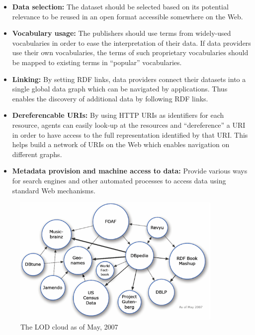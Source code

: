 \begin{itemize}
\item \textbf{Data selection:} The dataset should be selected based on its potential relevance to be reused in an open format accessible somewhere on the Web.
\item \textbf{Vocabulary usage:} The publishers should use terms from widely-used vocabularies in order to ease the interpretation of their data. If data providers use their own vocabularies, the terms of such proprietary vocabularies should be mapped to existing terms in ``popular'' vocabularies.

\item \textbf{Linking:} By setting RDF links, data providers connect their datasets into a single global data graph which can be navigated by applications. Thus enables the discovery of additional data by following RDF links.

\item \textbf{Dereferencable URIs:} By using HTTP URIs as identifiers for each resource, agents can easily look-up at the resources and ``dereference'' a URI in order to have access to the full representation identified by that URI. This helps build a network of URIs on the Web which enables navigation on different graphs. 

\item \textbf{Metadata provision and machine access to data:} Provide various ways for search engines and other automated processes to access data using standard Web mechanisms.
\end{itemize}

\begin{figure}[ht!]
\includegraphics[width=0.9\textwidth]{img/lod-cloud2007.png}
\caption{The LOD cloud as of May, 2007}
\label{fig:lodcloud2007}
\end{figure}

